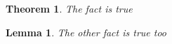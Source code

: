 \documentclass{article}
\newtheorem{thm}{Theorem}[thm]
\newtheorem{lemma}{Lemma}[thm]
\begin{document}
\begin{thm}
The fact is true
\end{thm}

\begin{lemma}
The other fact is true too
\end{lemma}
\end{document}
